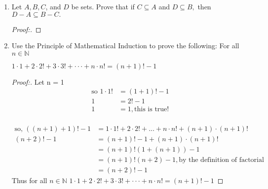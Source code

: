 \documentclass[11pt]{article}
\begin{document}
\begin{enumerate}
    \item Let $A,B,C$, and $D$ be sets. Prove that if $C \subseteq A$ and $D \subseteq B,$ then $D-A\subseteq B-C.$
        \begin{proof}[Proof:\nopunct]
        \end{proof}
        
\pagebreak
    \item Use the Principle of Mathematical Induction to prove the following: \newline
    For all $n \in \mathbb{N}$
    \begin{center}
        $1\cdot1+2\cdot2!+3\cdot3!+\cdot \cdot \cdot + n\cdot n!=(n+1)!-1$
    \end{center}
        \begin{proof}[Proof:\nopunct]
            Let n = 1
            \begin{align*}
                \text{so } 1\cdot1! & = (1+1)! - 1 \\
                1 & = 2! - 1 \\
                1 & = 1, \text{this is true!}
            \end{align*}
             \\
            \begin{align*}
                \text{so, }((n+1)+1)!-1 & = 1\cdot1! + 2\cdot2! + \text{...} + n\cdot n! + (n+1)\cdot(n+1)! \\
                (n+2)! - 1& = (n+1)! - 1 + (n+1)\cdot(n+1)! \\
                & = (n+1)!(1+(n+1))-1 \\
                & = (n+1)!(n+2)-1, \text{by the definition of factorial} \\
                & = (n+2)! - 1
            \end{align*}
            Thus for all $n \in \mathbb{N}$ $1\cdot1+2\cdot2!+3\cdot3!+\cdot \cdot \cdot + n\cdot n!=(n+1)!-1$
        \end{proof}
        

\end{enumerate}
\end{document}
